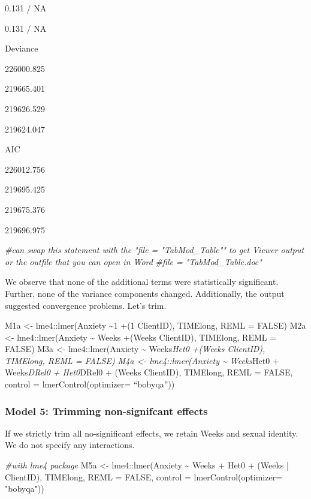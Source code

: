 \documentclass[
  11pt,
]{book}
\newenvironment{Shaded}{\begin{snugshade}}{\end{snugshade}}
\newcommand{\AttributeTok}[1]{\textcolor[rgb]{0.77,0.63,0.00}{#1}}
\newcommand{\CommentTok}[1]{\textcolor[rgb]{0.56,0.35,0.01}{\textit{#1}}}
\newcommand{\ConstantTok}[1]{\textcolor[rgb]{0.00,0.00,0.00}{#1}}
\newcommand{\FunctionTok}[1]{\textcolor[rgb]{0.00,0.00,0.00}{#1}}
\newcommand{\NormalTok}[1]{#1}
\newcommand{\OtherTok}[1]{\textcolor[rgb]{0.56,0.35,0.01}{#1}}
\newcommand{\SpecialCharTok}[1]{\textcolor[rgb]{0.00,0.00,0.00}{#1}}
\newcommand{\StringTok}[1]{\textcolor[rgb]{0.31,0.60,0.02}{#1}}
\begin{document}
0.131 / NA

0.131 / NA

Deviance

226000.825

219665.401

219626.529

219624.047

AIC

226012.756

219695.425

219675.376

219696.975

\begin{Shaded}
\begin{Highlighting}[]
\CommentTok{\#can swap this statement with the "file = "TabMod\_Table"" to get Viewer output or the outfile that you can open in Word}
\CommentTok{\#file = "TabMod\_Table.doc"}
\end{Highlighting}
\end{Shaded}

We observe that none of the additional terms were statistically significant. Further, none of the variance components changed. Additionally, the output suggested convergence problems. Let's trim.

M1a \textless- lme4::lmer(Anxiety \textasciitilde1 +(1 \textbar{} ClientID), TIMElong, REML = FALSE)
M2a \textless- lme4::lmer(Anxiety \textasciitilde{} Weeks +(Weeks \textbar{} ClientID), TIMElong, REML = FALSE)
M3a \textless- lme4::lmer(Anxiety \textasciitilde{} Weeks\emph{Het0 +(Weeks \textbar{} ClientID), TIMElong, REML = FALSE)
M4a \textless- lme4::lmer(Anxiety \textasciitilde{} Weeks}Het0 + Weeks\emph{DRel0 + Het0}DRel0 + (Weeks \textbar{} ClientID), TIMElong, REML = FALSE, control = lmerControl(optimizer= ``bobyqa''))

\hypertarget{model-5-trimming-non-signifcant-effects}{%
\subsubsection{Model 5: Trimming non-signifcant effects}\label{model-5-trimming-non-signifcant-effects}}

If we strictly trim all no-significant effects, we retain Weeks and sexual identity. We do not specify any interactions.

\begin{Shaded}
\begin{Highlighting}[]
\CommentTok{\#with lme4 package}
\NormalTok{M5a }\OtherTok{\textless{}{-}}\NormalTok{ lme4}\SpecialCharTok{::}\FunctionTok{lmer}\NormalTok{(Anxiety }\SpecialCharTok{\textasciitilde{}}\NormalTok{ Weeks }\SpecialCharTok{+}\NormalTok{ Het0 }\SpecialCharTok{+}\NormalTok{ (Weeks }\SpecialCharTok{|}\NormalTok{ ClientID), TIMElong, }\AttributeTok{REML =} \ConstantTok{FALSE}\NormalTok{, }\AttributeTok{control =} \FunctionTok{lmerControl}\NormalTok{(}\AttributeTok{optimizer=} \StringTok{"bobyqa"}\NormalTok{))}
\end{Highlighting}
\end{Shaded}
\end{document}
